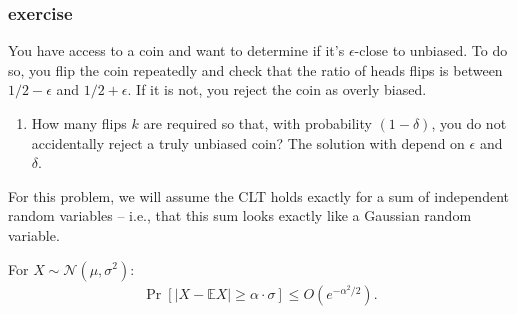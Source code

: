 \documentclass[handout,compress]{beamer}
\newcommand{\E}{\mathbb{E}}
\begin{document}
\begin{frame}
	\frametitle{exercise}
	\small 
	You have access to a coin and want to determine if it's $\epsilon$-close to unbiased. To do so, you flip the coin repeatedly and check that the ratio of heads flips is between $1/2 - \epsilon$ and $1/2 + \epsilon$. If it is not, you reject the coin as overly biased. 
	
	\begin{enumerate}[label=(\alph*)]
		\item How many flips $k$ are required so that, with probability $(1-\delta)$, you do not accidentally reject a truly unbiased coin? The solution with depend on $\epsilon$ and $\delta$.
	\end{enumerate}
	
	
	For this problem, we will assume the CLT holds exactly for a sum of independent random variables -- i.e., that this sum looks exactly like a Gaussian random variable.
	\begin{lemma}
		For $X \sim \mathcal{N}(\mu,\sigma^2)$:
		\begin{align*}
			\Pr[|X - \E X| \geq \alpha\cdot \sigma] \leq O(e^{-\alpha^2/2}).
		\end{align*}
	\end{lemma}
\end{frame}
\end{document}
